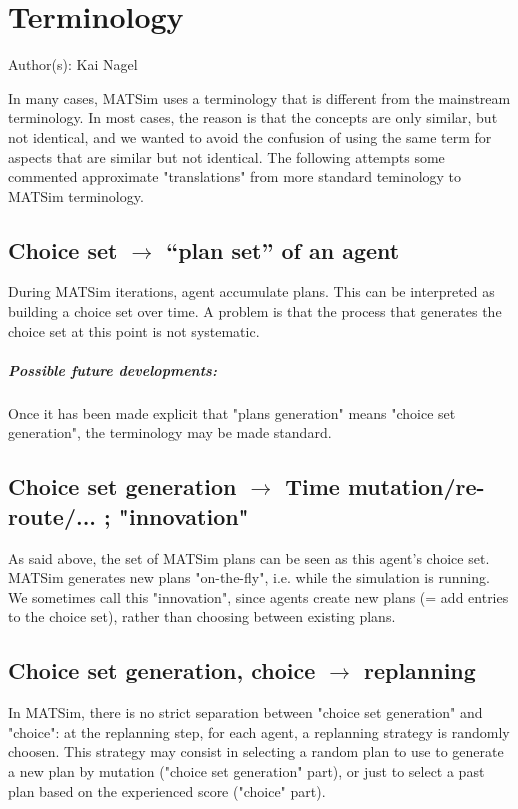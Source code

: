 \chapter{Terminology}

\centerline{\hfill Author(s): Kai Nagel}

\bigskip

In  many cases, MATSim uses a terminology that is different from the  mainstream terminology. In most cases, the reason is that the  concepts are only similar, but not identical, and we wanted to avoid the  confusion of using the same term for aspects that are similar but not  identical. The following attempts some commented approximate  "translations" from more standard teminology to MATSim terminology.

\section{Choice set $\to$ ``plan set'' of an agent}

During MATSim iterations, agent accumulate   plans. This can be  interpreted as building a choice set over  time. A  problem is that the  process that generates the choice  set at this  point is not systematic.

\paragraph{Possible future developments:} Once it has been made explicit that "plans generation" means "choice set generation", the terminology may be made standard.

\section{Choice set generation $\to$ Time mutation/re-route/... ; "innovation"}

As said above, the set of MATSim plans can   be seen as this agent's choice set. MATSim generates new plans   "on-the-fly", i.e. while the simulation is running. We sometimes  call  this "innovation", since agents create new plans (= add entries to  the  choice set), rather than choosing between existing plans.

\section{Choice set generation, choice $\to$ replanning}

In MATSim, there is no strict separation between "choice set  generation" and "choice": at the replanning step, for each agent, a  replanning strategy is randomly choosen. This strategy may consist in  selecting a random plan to use to generate a new plan by mutation  ("choice set generation" part), or just to select a past plan based on  the experienced score ("choice" part).

